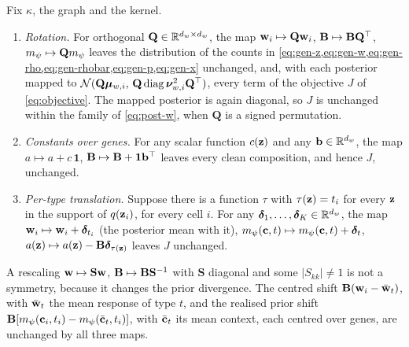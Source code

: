\begin{proposition}\label{prop:symmetries}
Fix $\kappa$, the graph and the kernel.
\begin{enumerate}[label=(\alph*), leftmargin=*, nosep]
\item \emph{Rotation.} For orthogonal $\mathbf{Q} \in \mathbb{R}^{d_w \times d_w}$, the map $\mathbf{w}_i \mapsto \mathbf{Q}\mathbf{w}_i$, $\mathbf{B} \mapsto \mathbf{B}\mathbf{Q}^\top$, $m_{\psi} \mapsto \mathbf{Q}m_{\psi}$ leaves the distribution of the counts in \cref{eq:gen-z,eq:gen-w,eq:gen-rho,eq:gen-rhobar,eq:gen-p,eq:gen-x} unchanged, and, with each posterior mapped to $\mathcal{N}(\mathbf{Q}\boldsymbol{\mu}_{w,i},\, \mathbf{Q}\operatorname{diag}\boldsymbol{\nu}_{w,i}^2\mathbf{Q}^\top)$, every term of the objective $J$ of \cref{eq:objective}. The mapped posterior is again diagonal, so $J$ is unchanged within the family of \cref{eq:post-w}, when $\mathbf{Q}$ is a signed permutation.
\item \emph{Constants over genes.} For any scalar function $c(\mathbf{z})$ and any $\mathbf{b} \in \mathbb{R}^{d_w}$, the map $a \mapsto a + c\,\mathbf{1}$, $\mathbf{B} \mapsto \mathbf{B} + \mathbf{1}\mathbf{b}^\top$ leaves every clean composition, and hence $J$, unchanged.
\item \emph{Per-type translation.} Suppose there is a function $\tau$ with $\tau(\mathbf{z}) = t_i$ for every $\mathbf{z}$ in the support of $q(\mathbf{z}_i)$, for every cell $i$. For any $\boldsymbol{\delta}_1, \dots, \boldsymbol{\delta}_K \in \mathbb{R}^{d_w}$, the map $\mathbf{w}_i \mapsto \mathbf{w}_i + \boldsymbol{\delta}_{t_i}$ (the posterior mean with it), $m_{\psi}(\mathbf{c}, t) \mapsto m_{\psi}(\mathbf{c}, t) + \boldsymbol{\delta}_t$, $a(\mathbf{z}) \mapsto a(\mathbf{z}) - \mathbf{B}\boldsymbol{\delta}_{\tau(\mathbf{z})}$ leaves $J$ unchanged.
\end{enumerate}
A rescaling $\mathbf{w} \mapsto \mathbf{S}\mathbf{w}$, $\mathbf{B} \mapsto \mathbf{B}\mathbf{S}^{-1}$ with $\mathbf{S}$ diagonal and some $|S_{kk}| \neq 1$ is not a symmetry, because it changes the prior divergence.
The centred shift $\mathbf{B}(\mathbf{w}_i - \bar{\mathbf{w}}_t)$, with $\bar{\mathbf{w}}_t$ the mean response of type $t$, and the realised prior shift $\mathbf{B}[m_{\psi}(\mathbf{c}_i, t_i) - m_{\psi}(\bar{\mathbf{c}}_t, t_i)]$, with $\bar{\mathbf{c}}_t$ its mean context, each centred over genes, are unchanged by all three maps.
\end{proposition}

